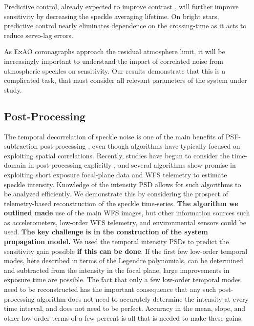 \documentclass[10pt,preprint]{aastex631}
\begin{document}
Predictive control, already expected to improve contrast \citep{2007JOSAA..24.2645P,2017JOSAA..34.1877C,2018JATIS...4a9001M, 2021arXiv210307566H}, will further improve sensitivity by decreasing the speckle averaging lifetime.  On bright stars, predictive control nearly eliminates dependence on the crossing-time as it acts to reduce servo-lag errors.

As ExAO coronagraphs approach the residual atmosphere limit, it will be increasingly important to understand the impact of correlated noise from atmospheric speckles on sensitivity.  Our results demonstrate that this is a complicated task, that must consider all relevant parameters of the system under study.

\subsection{Post-Processing}
The temporal decorrelation of speckle noise is one of the main benefits of PSF-subtraction post-processing \citep{2006ApJ...641..556M,2008ApJ...673..647M}, even though algorithms have typically focused on exploiting spatial correlations.  Recently, studies have begun to consider the time-domain in post-processing explicitly \citep{2021A&A...646A..24S}, and several algorithms show promise in exploiting short exposure focal-plane data \citep{2019PASP..131k4506W, 2021arXiv210306898S} and WFS telemetry \textbf{\citep[][submitted]{2021arXiv210506589R}\citep[][submitted]{2021arXiv210506590F}} to estimate speckle intensity.   Knowledge of the intensity PSD allows for such algorithms to be analyzed efficiently.  We demonstrate this by considering the prospect of telemetry-based reconstruction of the speckle time-series. \textbf{The algorithm we outlined made} use of the main WFS images, but other information sources such as accelerometers, low-order WFS telemetry, and environmental sensors could be used.  \textbf{The key challenge is in the construction of the system propagation model.}  We used the temporal intensity PSDs to predict the sensitivity gain possible \textbf{if this can be done}.  If the first few low-order temporal modes, here described in terms of the Legendre polynomials, can be determined and subtracted from the intensity in the focal plane, large improvements in exposure time are possible.  The fact that only a few low-order temporal modes need to be reconstructed has the important consequence that any such post-processing algorithm does not need to accurately determine the intensity at every time interval, and does not need to be perfect.  Accuracy in the mean, slope, and other low-order terms of a few percent is all that is needed to make these gains.
\end{document}
